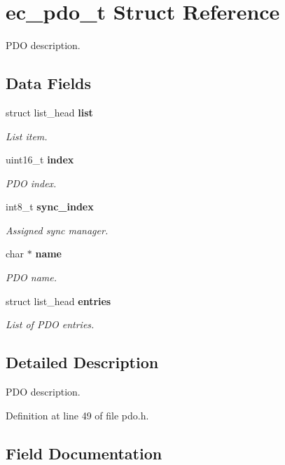 \section{ec\-\_\-pdo\-\_\-t \-Struct \-Reference}
\label{structec__pdo__t}


\-P\-D\-O description.  


\subsection*{\-Data \-Fields}
\begin{DoxyCompactItemize}
\item 
struct list\-\_\-head {\bf list}
\begin{DoxyCompactList}\small\item\em \-List item. \end{DoxyCompactList}\item 
uint16\-\_\-t {\bf index}
\begin{DoxyCompactList}\small\item\em \-P\-D\-O index. \end{DoxyCompactList}\item 
int8\-\_\-t {\bf sync\-\_\-index}
\begin{DoxyCompactList}\small\item\em \-Assigned sync manager. \end{DoxyCompactList}\item 
char $\ast$ {\bf name}
\begin{DoxyCompactList}\small\item\em \-P\-D\-O name. \end{DoxyCompactList}\item 
struct list\-\_\-head {\bf entries}
\begin{DoxyCompactList}\small\item\em \-List of \-P\-D\-O entries. \end{DoxyCompactList}\end{DoxyCompactItemize}


\subsection{\-Detailed \-Description}
\-P\-D\-O description. 

\-Definition at line 49 of file pdo.\-h.



\subsection{\-Field \-Documentation}
